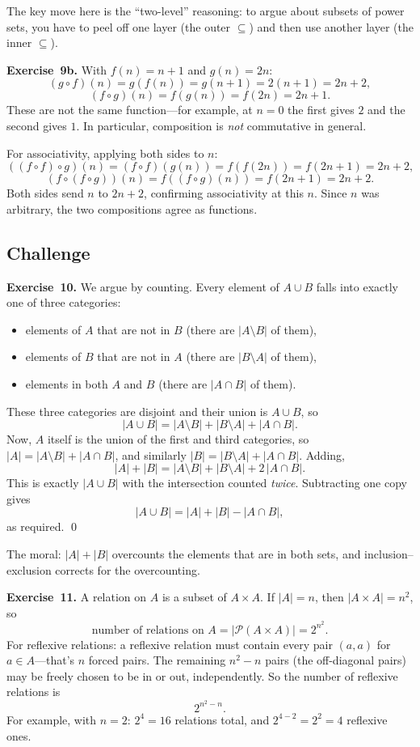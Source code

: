 \documentclass[11pt]{article}
\begin{document}
The key move here is the ``two-level'' reasoning: to argue about subsets of power sets, you have to peel off one layer (the outer $\subseteq$) and then use another layer (the inner $\subseteq$).

\medskip
\textbf{Exercise~9b.}
With $f(n) = n+1$ and $g(n) = 2n$:
\[
  (g \circ f)(n) = g(f(n)) = g(n+1) = 2(n+1) = 2n + 2,
\]
\[
  (f \circ g)(n) = f(g(n)) = f(2n) = 2n + 1.
\]
These are not the same function---for example, at $n = 0$ the first gives $2$ and the second gives $1$. In particular, composition is \emph{not} commutative in general.

For associativity, applying both sides to $n$:
\[
  ((f \circ f) \circ g)(n) = (f \circ f)(g(n)) = f(f(2n)) = f(2n+1) = 2n + 2,
\]
\[
  (f \circ (f \circ g))(n) = f((f \circ g)(n)) = f(2n+1) = 2n + 2.
\]
Both sides send $n$ to $2n+2$, confirming associativity at this $n$. Since $n$ was arbitrary, the two compositions agree as functions.

\subsection*{Challenge}

\textbf{Exercise~10.}
We argue by counting. Every element of $A \cup B$ falls into exactly one of three categories:
\begin{itemize}
  \item elements of $A$ that are not in $B$ (there are $|A \setminus B|$ of them),
  \item elements of $B$ that are not in $A$ (there are $|B \setminus A|$ of them),
  \item elements in both $A$ and $B$ (there are $|A \cap B|$ of them).
\end{itemize}
These three categories are disjoint and their union is $A \cup B$, so
\[
  |A \cup B| = |A \setminus B| + |B \setminus A| + |A \cap B|.
\]
Now, $A$ itself is the union of the first and third categories, so $|A| = |A \setminus B| + |A \cap B|$, and similarly $|B| = |B \setminus A| + |A \cap B|$. Adding,
\[
  |A| + |B| = |A \setminus B| + |B \setminus A| + 2\,|A \cap B|.
\]
This is exactly $|A \cup B|$ with the intersection counted \emph{twice}. Subtracting one copy gives
\[
  |A \cup B| = |A| + |B| - |A \cap B|,
\]
as required. \qed

The moral: $|A| + |B|$ overcounts the elements that are in both sets, and inclusion--exclusion corrects for the overcounting.

\medskip
\textbf{Exercise~11.}
A relation on $A$ is a subset of $A \times A$. If $|A| = n$, then $|A \times A| = n^2$, so
\[
  \text{number of relations on } A = |\mathcal{P}(A \times A)| = 2^{n^2}.
\]
For reflexive relations: a reflexive relation must contain every pair $(a, a)$ for $a \in A$---that's $n$ forced pairs. The remaining $n^2 - n$ pairs (the off-diagonal pairs) may be freely chosen to be in or out, independently. So the number of reflexive relations is
\[
  2^{n^2 - n}.
\]
For example, with $n = 2$: $2^4 = 16$ relations total, and $2^{4-2} = 2^2 = 4$ reflexive ones.
\end{document}
